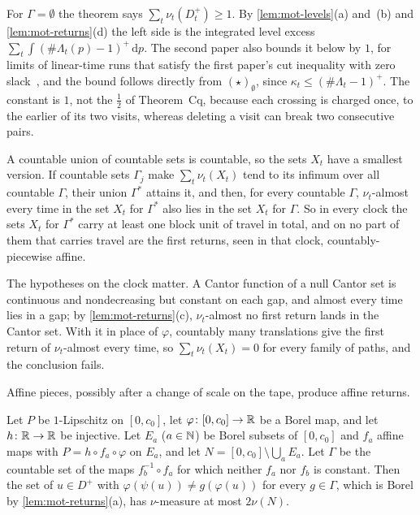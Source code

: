 For $\Gamma=\emptyset$ the theorem says $\sum_t\nu_t(D^+_t)\ge1$. By \cref{lem:mot-levels}(a) and~(b) and
\cref{lem:mot-returns}(d) the left side is the integrated level excess $\sum_t\int(\#\Lambda_t(p)-1)^+\,\mathrm dp$. The
second paper also bounds it below by $1$, for limits of linear-time runs that satisfy the first paper's cut inequality
with zero slack~\cite[Section~8]{SecondPaper2026}, and the bound follows directly from $(\star)_\emptyset$, since
$\kappa_t\le(\#\Lambda_t-1)^+$. The constant is $1$, not the $\frac12$ of Theorem~Cq, because each crossing is charged
once, to the earlier of its two visits, whereas deleting a visit can break two consecutive pairs.

A countable union of countable sets is countable, so the sets $X_t$ have a smallest version. If countable sets
$\Gamma_j$ make $\sum_t\nu_t(X_t)$ tend to its infimum over all countable $\Gamma$, their union $\Gamma^*$ attains it, and
then, for every countable $\Gamma$, $\nu_t$-almost every time in the set $X_t$ for $\Gamma^*$ also lies in the set $X_t$
for $\Gamma$. So in every clock the sets $X_t$ for $\Gamma^*$ carry at least one block unit of travel in total, and on no
part of them that carries travel are the first returns, seen in that clock, countably-piecewise affine.

The hypotheses on the clock matter. A Cantor function of a null Cantor set is continuous and nondecreasing but constant
on each gap, and almost every time lies in a gap; by \cref{lem:mot-returns}(c), $\nu_t$-almost no first return lands in
the Cantor set. With it in place of $\varphi$, countably many translations give the first return of $\nu_t$-almost every
time, so $\sum_t\nu_t(X_t)=0$ for every family of paths, and the conclusion fails.

Affine pieces, possibly after a change of scale on the tape, produce affine returns.

\begin{lemma}\label{lem:mot-transitions}
\notformalized
Let $P$ be $1$-Lipschitz on $[0,c_0]$, let $\varphi\colon[0,c_0]\to\mathbb{R}$ be a Borel map, and let $h\colon\mathbb{R}\to\mathbb{R}$ be
injective. Let $E_a$ ($a\in\mathbb{N}$) be Borel subsets of $[0,c_0]$ and $f_a$ affine maps with $P=h\circ f_a\circ\varphi$ on
$E_a$, and let $N=[0,c_0]\setminus\bigcup_aE_a$. Let $\Gamma$ be the countable set of the maps $f_b^{-1}\circ f_a$ for
which neither $f_a$ nor $f_b$ is constant. Then the set of $u\in D^+$ with $\varphi(\psi(u))\ne g(\varphi(u))$ for every
$g\in\Gamma$, which is Borel by \cref{lem:mot-returns}(a), has $\nu$-measure at most $2\nu(N)$.
\end{lemma}

